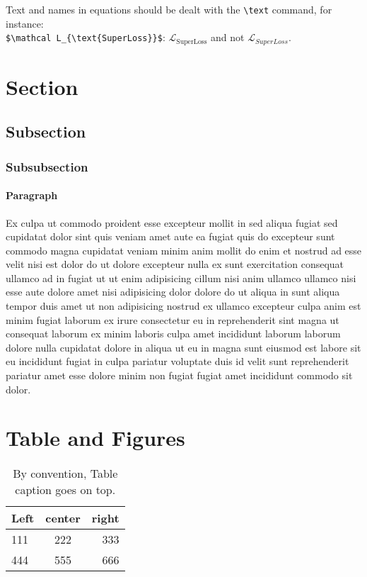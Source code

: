 \documentclass[twoside,11pt]{article}
\begin{document}
		Text and names in equations should be dealt with the \verb|\text| command, for instance:\\
		\verb|$\mathcal L_{\text{SuperLoss}}$|: $\mathcal L_{\text{SuperLoss}}$ and not $\mathcal L_{SuperLoss}$.



\section{Section}
	\subsection{Subsection}
		\subsubsection{Subsubsection}
			\paragraph{Paragraph} Ex culpa ut commodo proident esse excepteur mollit in sed aliqua fugiat sed cupidatat dolor sint quis veniam amet aute ea fugiat quis do excepteur sunt commodo magna cupidatat veniam minim anim mollit do enim et nostrud ad esse velit nisi est dolor do ut dolore excepteur nulla ex sunt exercitation consequat ullamco ad in fugiat ut ut enim adipisicing cillum nisi anim ullamco ullamco nisi esse aute dolore amet nisi adipisicing dolor dolore do ut aliqua in sunt aliqua tempor duis amet ut non adipisicing nostrud ex ullamco excepteur culpa anim est minim fugiat laborum ex irure consectetur eu in reprehenderit sint magna ut consequat laborum ex minim laboris culpa amet incididunt laborum laborum dolore nulla cupidatat dolore in aliqua ut eu in magna sunt eiusmod est labore sit eu incididunt fugiat in culpa pariatur voluptate duis id velit sunt reprehenderit pariatur amet esse dolore minim non fugiat fugiat amet incididunt commodo sit dolor.

\section{Table and Figures}
	\begin{table}[h] %
		\centering
		\caption{By convention, Table caption goes on top.}
		\begin{tabular}{lcr}
			\textbf{Left} & \textbf{center} & \textbf{right} \\
			\hline
			111 & 222 & 333 \\
			444 & 555 & 666
		\end{tabular}
	\end{table}
\end{document}
